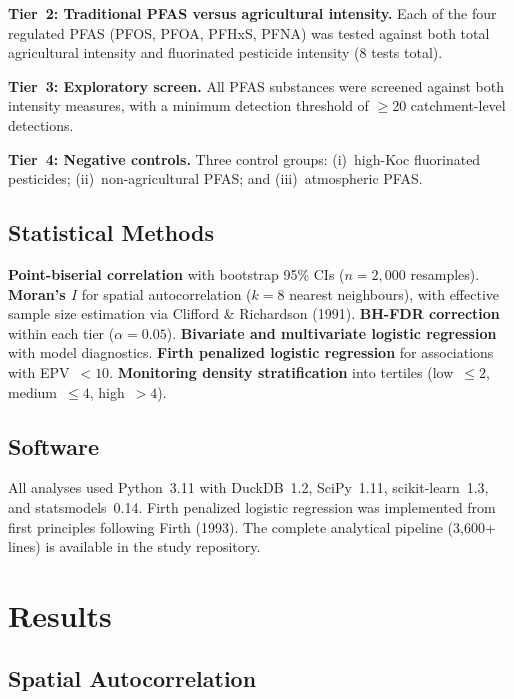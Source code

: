 \documentclass[12pt,a4paper]{article}
\begin{document}
\textbf{Tier~2: Traditional PFAS versus agricultural intensity.} Each of the four regulated PFAS (PFOS, PFOA, PFHxS, PFNA) was tested against both total agricultural intensity and fluorinated pesticide intensity (8 tests total).

\textbf{Tier~3: Exploratory screen.} All PFAS substances were screened against both intensity measures, with a minimum detection threshold of $\geq$20 catchment-level detections.

\textbf{Tier~4: Negative controls.} Three control groups: (i)~high-Koc fluorinated pesticides; (ii)~non-agricultural PFAS; and (iii)~atmospheric PFAS.

\subsection{Statistical Methods}

\textbf{Point-biserial correlation} with bootstrap 95\% CIs ($n = 2{,}000$ resamples). \textbf{Moran's $I$} for spatial autocorrelation ($k = 8$ nearest neighbours), with effective sample size estimation via Clifford \& Richardson (1991). \textbf{BH-FDR correction} within each tier ($\alpha = 0.05$). \textbf{Bivariate and multivariate logistic regression} with model diagnostics. \textbf{Firth penalized logistic regression} for associations with EPV~$< 10$. \textbf{Monitoring density stratification} into tertiles (low~$\leq 2$, medium~$\leq 4$, high~$> 4$).

\subsection{Software}

All analyses used Python~3.11 with DuckDB~1.2, SciPy~1.11, scikit-learn~1.3, and statsmodels~0.14. Firth penalized logistic regression was implemented from first principles following Firth (1993). The complete analytical pipeline (3,600+ lines) is available in the study repository.

\section{Results}

\subsection{Spatial Autocorrelation}
\end{document}
